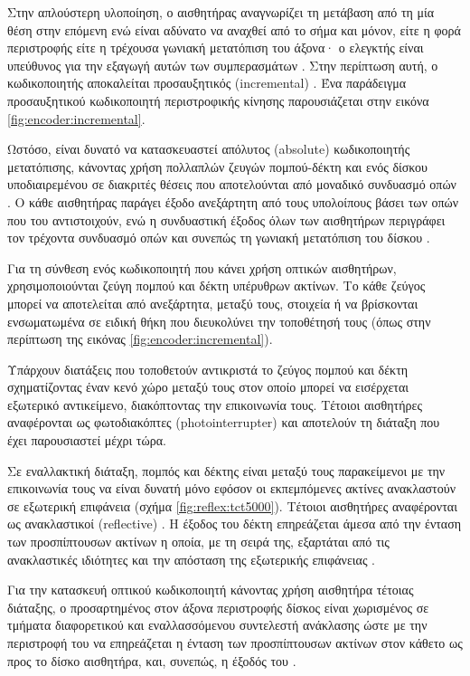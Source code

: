 Στην απλούστερη υλοποίηση, ο αισθητήρας αναγνωρίζει τη μετάβαση από τη μία θέση
στην επόμενη ενώ είναι αδύνατο να αναχθεί από το σήμα και μόνον, είτε η φορά
περιστροφής είτε η τρέχουσα γωνιακή μετατόπιση του άξονα· ο ελεγκτής είναι
υπεύθυνος για την εξαγωγή αυτών των συμπερασμάτων \parencites[5--6]{lynch02}
[13]{drc76}. Στην περίπτωση αυτή, ο κωδικοποιητής αποκαλείται
προσαυξητικός (incremental)
\parencite[5]{lynch02}. Ένα παράδειγμα προσαυξητικού κωδικοποιητή περιστροφικής
κίνησης παρουσιάζεται στην εικόνα \ref{fig:encoder:incremental}.

Ωστόσο, είναι δυνατό να κατασκευαστεί απόλυτος (absolute)
κωδικοποιητής μετατόπισης, κάνοντας
χρήση πολλαπλών ζευγών πομπού-δέκτη και ενός δίσκου υποδιαιρεμένου σε διακριτές
θέσεις που αποτελούνται από μοναδικό συνδυασμό οπών \parencites[6]{lynch02}. Ο
κάθε αισθητήρας παράγει έξοδο ανεξάρτητη από τους υπολοίπους βάσει των οπών που
του αντιστοιχούν, ενώ η συνδυαστική έξοδος όλων των αισθητήρων περιγράφει τον
τρέχοντα συνδυασμό οπών και συνεπώς τη γωνιακή μετατόπιση του δίσκου
\parencites[6]{lynch02}.

Για τη σύνθεση ενός κωδικοποιητή που κάνει χρήση οπτικών αισθητήρων,
χρησιμοποιούνται ζεύγη πομπού και δέκτη υπέρυθρων ακτίνων. Το κάθε ζεύγος μπορεί
να αποτελείται από ανεξάρτητα, μεταξύ τους, στοιχεία ή να βρίσκονται
ενσωματωμένα σε ειδική θήκη που διευκολύνει την τοποθέτησή τους (όπως στην
περίπτωση της εικόνας \ref{fig:encoder:incremental}).

Υπάρχουν διατάξεις που τοποθετούν αντικριστά το ζεύγος πομπού και δέκτη
σχηματίζοντας έναν κενό χώρο μεταξύ τους στον οποίο μπορεί να εισέρχεται
εξωτερικό αντικείμενο, διακόπτοντας την επικοινωνία τους. Τέτοιοι αισθητήρες
αναφέρονται ως φωτοδιακόπτες
(photointerrupter) \parencite[3]{lynch02} και αποτελούν τη διάταξη που
έχει παρουσιαστεί μέχρι τώρα.

Σε εναλλακτική διάταξη, πομπός και δέκτης είναι μεταξύ τους παρακείμενοι με την
επικοινωνία τους να είναι δυνατή μόνο εφόσον οι εκπεμπόμενες ακτίνες ανακλαστούν
σε εξωτερική επιφάνεια (σχήμα \ref{fig:reflex:tct5000}).
Τέτοιοι αισθητήρες αναφέρονται ως ανακλαστικοί 
(reflective) \parencite[3]{lynch02}.
Η έξοδος του δέκτη επηρεάζεται άμεσα από την ένταση των προσπίπτουσων ακτίνων η
οποία, με τη σειρά της, εξαρτάται από τις ανακλαστικές ιδιότητες και την
απόσταση της εξωτερικής επιφάνειας \parencite{vishay06}.

Για την κατασκευή
οπτικού κωδικοποιητή κάνοντας χρήση αισθητήρα τέτοιας διάταξης, ο προσαρτημένος
στον άξονα περιστροφής δίσκος είναι χωρισμένος σε τμήματα διαφορετικού και
εναλλασσόμενου συντελεστή ανάκλασης ώστε με την περιστροφή του να επηρεάζεται η
ένταση των προσπίπτουσων ακτίνων στον κάθετο ως προς το δίσκο αισθητήρα, και,
συνεπώς, η έξοδός του \parencite[11]{vishay02}.


